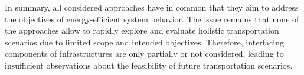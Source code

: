 





In summary, all considered approaches have in common that they aim to address the objectives of energy-efficient system behavior.
The issue remains that none of the approaches allow to rapidly explore and evaluate holistic transportation scenarios due to limited scope and intended objectives. Therefore, interfacing components of infrastructures are only partially or not considered, leading to insufficient observations about the feasibility of future transportation scenarios.

